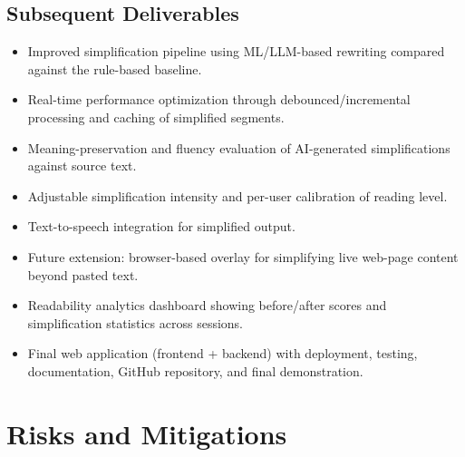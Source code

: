 \documentclass[11pt,a4paper]{article}
\begin{document}
\subsection{Subsequent Deliverables}
\begin{itemize}[leftmargin=0.7cm]
    \item Improved simplification pipeline using ML/LLM-based rewriting compared against the rule-based baseline.
    
    \item Real-time performance optimization through debounced/incremental processing and caching of simplified segments.
    
    \item Meaning-preservation and fluency evaluation of AI-generated simplifications against source text.
    
    \item Adjustable simplification intensity and per-user calibration of reading level.
    
    \item Text-to-speech integration for simplified output.
    
    \item Future extension: browser-based overlay for simplifying live web-page content beyond pasted text.
    
    \item Readability analytics dashboard showing before/after scores and simplification statistics across sessions.
    
    \item Final web application (frontend + backend) with deployment, testing, documentation, GitHub repository, and final demonstration.
\end{itemize}

\section{Risks and Mitigations}
\end{document}
